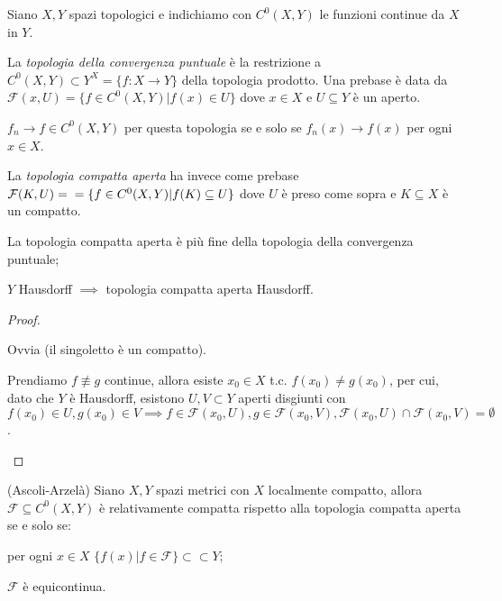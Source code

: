 Siano $X, Y$ spazi topologici e indichiamo con $C^0(X, Y)$ le funzioni continue da $X$ in $Y$.

La \textit{topologia della convergenza puntuale} è la restrizione a $C^0(X, Y) \subset Y^X=\{f:X \rightarrow Y\}$ della topologia prodotto. Una prebase è data da $\mathcal{F}(x, U)=\{f \in C^0(X, Y) |f(x) \in U\}$ dove $x \in X$ e $U \subseteq Y$ è un aperto.

\begin{exc}
  $f_n \rightarrow f \in C^0(X, Y)$ per questa topologia se e solo se $f_n(x) \rightarrow f(x)$ per ogni $x \in X$.
\end{exc}

La \textit{topologia compatta aperta} ha invece come prebase $\mathcal{F}(K, U)= \\ =\{f \in C^0(X, Y) | f(K) \subseteq U\}$ dove $U$ è preso come sopra e $K \subseteq X$ è un compatto.

\begin{prop}
  \begin{nlist}
    \item La topologia compatta aperta è più fine della topologia della convergenza puntuale;
    \item $Y$ Hausdorff $\implies$ topologia compatta aperta Hausdorff.
  \end{nlist}
\end{prop}

\begin{proof}
  \begin{nlist}
    \item Ovvia (il singoletto è un compatto).
    \item Prendiamo $f \not\equiv g$ continue, allora esiste $x_0 \in X$ t.c. $f(x_0) \not= g(x_0)$, per cui, dato che $Y$ è Hausdorff,
    esistono $U, V \subset Y$ aperti disgiunti con $f(x_0) \in U, g(x_0) \in V \implies f \in \mathcal{F}(x_0, U), g \in \mathcal{F}(x_0, V), \mathcal{F}(x_0, U) \cap \mathcal{F}(x_0, V)=\emptyset$.
  \end{nlist}
\end{proof}

\begin{thm}
  (Ascoli-Arzelà) Siano $X, Y$ spazi metrici con $X$ localmente compatto, allora $\mathcal{F} \subseteq C^0(X, Y)$ è relativamente compatta rispetto alla topologia compatta aperta se e solo se:
  \begin{nlist}
    \item per ogni $x \in X$ $\{f(x) | f \in \mathcal{F}\} \subset \subset Y$;
    \item $\mathcal{F}$ è equicontinua.
  \end{nlist}
\end{thm}


